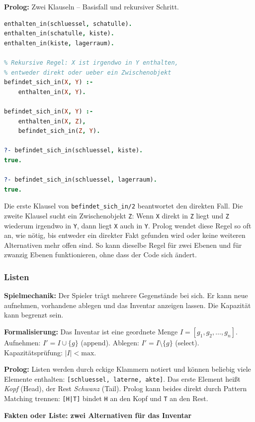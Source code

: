 \documentclass[parskip=half,a4paper,11pt]{scrreprt}
\begin{document}
\textbf{Prolog:} Zwei Klauseln -- Basisfall und rekursiver Schritt.
\begin{lstlisting}[language=Prolog, caption={}]
% Direkte Enthaltensein-Beziehung
enthalten_in(schluessel, schatulle).
enthalten_in(schatulle, kiste).
enthalten_in(kiste, lagerraum).

% Rekursive Regel: X ist irgendwo in Y enthalten,
% entweder direkt oder ueber ein Zwischenobjekt
befindet_sich_in(X, Y) :-
    enthalten_in(X, Y).

befindet_sich_in(X, Y) :-
    enthalten_in(X, Z),
    befindet_sich_in(Z, Y).

?- befindet_sich_in(schluessel, kiste).
true.

?- befindet_sich_in(schluessel, lagerraum).
true.
\end{lstlisting}
Die erste Klausel von \texttt{befindet\_sich\_in/2} beantwortet den direkten Fall. Die zweite Klausel sucht ein Zwischenobjekt \texttt{Z}: Wenn \texttt{X} direkt in \texttt{Z} liegt und \texttt{Z} wiederum irgendwo in \texttt{Y}, dann liegt \texttt{X} auch in \texttt{Y}. Prolog wendet diese Regel so oft an, wie nötig, bis entweder ein direkter Fakt gefunden wird oder keine weiteren Alternativen mehr offen sind. So kann dieselbe Regel für zwei Ebenen und für zwanzig Ebenen funktionieren, ohne dass der Code sich ändert.

\subsubsection{Listen}

\textbf{Spielmechanik:} Der Spieler trägt mehrere Gegenstände bei sich. Er kann neue aufnehmen, vorhandene ablegen und das Inventar anzeigen lassen. Die Kapazität kann begrenzt sein.

\textbf{Formalisierung:} Das Inventar ist eine geordnete Menge $I = [g_1, g_2, \ldots, g_n]$. Aufnehmen: $I' = I \cup \{g\}$ (append). Ablegen: $I' = I \setminus \{g\}$ (select). Kapazitätsprüfung: $|I| < \text{max}$.

\textbf{Prolog:} Listen werden durch eckige Klammern notiert und können beliebig viele Elemente enthalten: \texttt{[schluessel, laterne, akte]}. Das erste Element heißt \emph{Kopf} (Head), der Rest \emph{Schwanz} (Tail). Prolog kann beides direkt durch Pattern Matching trennen: \texttt{[H|T]} bindet \texttt{H} an den Kopf und \texttt{T} an den Rest.

\textbf{Fakten oder Liste: zwei Alternativen für das Inventar}
\end{document}
